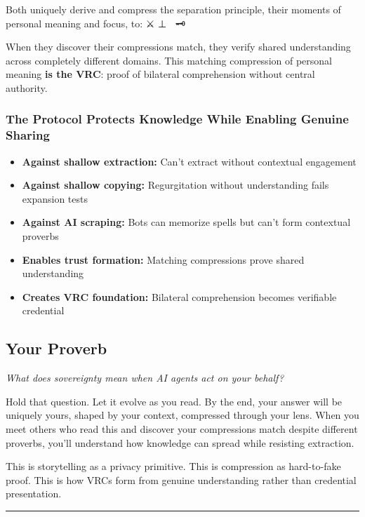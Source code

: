 \documentclass[
]{article}
\begin{document}
Both uniquely derive and compress the separation principle, their
moments of personal meaning and focus, to: ⚔️ ⊥ 🔮 \textbar{} 🗝️

When they discover their compressions match, they verify shared
understanding across completely different domains. This matching
compression of personal meaning \textbf{is the VRC}: proof of bilateral
comprehension without central authority.

\subsubsection{The Protocol Protects Knowledge While Enabling Genuine
Sharing}\label{the-protocol-protects-knowledge-while-enabling-genuine-sharing}

\begin{itemize}
\item
  \textbf{Against shallow extraction:} Can't extract without contextual
  engagement
\item
  \textbf{Against shallow copying:} Regurgitation without understanding
  fails expansion tests
\item
  \textbf{Against AI scraping:} Bots can memorize spells but can't form
  contextual proverbs
\item
  \textbf{Enables trust formation:} Matching compressions prove shared
  understanding
\item
  \textbf{Creates VRC foundation:} Bilateral comprehension becomes
  verifiable credential
\end{itemize}

\subsection{Your Proverb}\label{your-proverb}

\emph{What does sovereignty mean when AI agents act on your behalf?}

Hold that question. Let it evolve as you read. By the end, your answer
will be uniquely yours, shaped by your context, compressed through your
lens. When you meet others who read this and discover your compressions
match despite different proverbs, you'll understand how knowledge can
spread while resisting extraction.

This is storytelling as a privacy primitive. This is compression as
hard-to-fake proof. This is how VRCs form from genuine understanding
rather than credential presentation.

\begin{center}\rule{0.5\linewidth}{0.5pt}\end{center}
\end{document}
